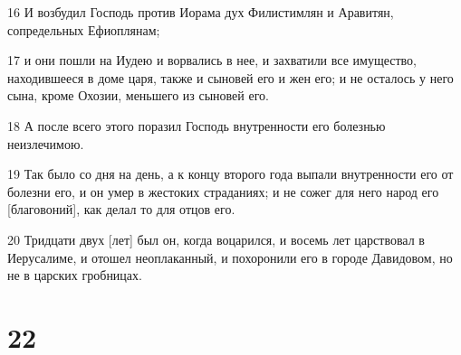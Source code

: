 \par 16 И возбудил Господь против Иорама дух Филистимлян и Аравитян, сопредельных Ефиоплянам;
\par 17 и они пошли на Иудею и ворвались в нее, и захватили все имущество, находившееся в доме царя, также и сыновей его и жен его; и не осталось у него сына, кроме Охозии, меньшего из сыновей его.
\par 18 А после всего этого поразил Господь внутренности его болезнью неизлечимою.
\par 19 Так было со дня на день, а к концу второго года выпали внутренности его от болезни его, и он умер в жестоких страданиях; и не сожег для него народ его [благовоний], как делал то для отцов его.
\par 20 Тридцати двух [лет] был он, когда воцарился, и восемь лет царствовал в Иерусалиме, и отошел неоплаканный, и похоронили его в городе Давидовом, но не в царских гробницах.

\chapter{22}

